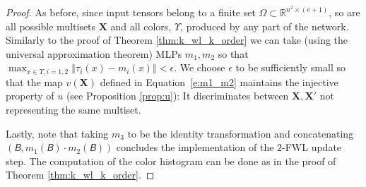 \documentclass{article}
\newcommand{\norm}[1]{\left\Vert#1\right\Vert}
\newcommand{\Real}{\mathbb R}
\def\Eqref#1{Equation~\ref{#1}}
\def\mX{{\bm{X}}}
\newcommand{\tens}[1]{\bm{\mathsfit{#1}}}
\def\tB{{\tens{B}}}
\begin{document}
\begin{proof}
As before, since input tensors belong to a finite set $\Omega\subset \Real^{n^2\times(e+1)}$, so are all possible multisets $\mX$ and all colors, $\Upsilon$, produced by any part of the network. Similarly to the proof of Theorem \ref{thm:k_wl_k_order} we can take (using the universal approximation theorem) MLPs $m_1,m_2$ so that $\max_{x\in \Upsilon, i=1,2}\norm{\tau_i(x)-m_i(x)}<\epsilon$. We choose $\epsilon$ to be sufficiently small so that the map $v(\mX)$ defined in \Eqref{e:m1_m2}  maintains the injective property of $u$ (see Proposition \ref{prop:u}): It discriminates between $\mX,\mX'$ not representing the same multiset. 


Lastly, note that taking $m_3$ to be the identity transformation and concatenating  $(\tB, m_1(\tB)\cdot m_2(\tB))$ concludes the implementation of the $2$-FWL update step. The computation of the color histogram can be done as in the proof of Theorem \ref{thm:k_wl_k_order}.

\end{proof}
\end{document}
